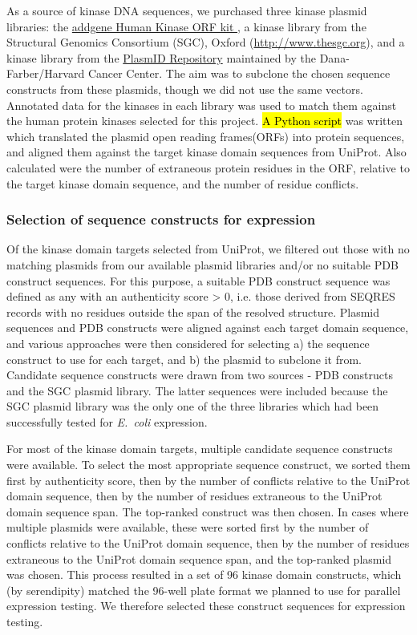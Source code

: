 \documentclass[9pt,lineno]{elife}
\begin{document}
As a source of kinase DNA sequences, we purchased three kinase plasmid libraries: the \href{https://www.addgene.org/human-kinase/}{addgene Human Kinase ORF kit }, a kinase library from the Structural Genomics Consortium (SGC), Oxford (\url{http://www.thesgc.org}), and a kinase library from the \href{https://plasmid.med.harvard.edu/PLASMID/Home.xhtml}{PlasmID Repository} maintained by the Dana-Farber/Harvard Cancer Center.
The aim was to subclone the chosen sequence constructs from these plasmids, though we did not use the same vectors.
Annotated data for the kinases in each library was used to match them against the human protein kinases selected for this project.
\hl{A Python script} was written which translated the plasmid open reading frames(ORFs) into protein sequences, and aligned them against the target kinase domain sequences from UniProt.
Also calculated were the number of extraneous protein residues in the ORF, relative to the target kinase domain sequence, and the number of residue conflicts.


\subsubsection{Selection of sequence constructs for expression}

Of the kinase domain targets selected from UniProt, we filtered out those with no matching plasmids from our available plasmid libraries and/or no suitable PDB construct sequences.
For this purpose, a suitable PDB construct sequence was defined as any with an authenticity score > 0, i.e. those derived from SEQRES records with no residues outside the span of the resolved structure.
Plasmid sequences and PDB constructs were aligned against each target domain sequence, and various approaches were then considered for selecting a) the sequence construct to use for each target, and b) the plasmid to subclone it from.
Candidate sequence constructs were drawn from two sources - PDB constructs and the SGC plasmid library.
The latter sequences were included because the SGC plasmid library was the only one of the three libraries which had been successfully tested for \emph{E.~coli} expression.

For most of the kinase domain targets, multiple candidate sequence constructs were available.
To select the most appropriate sequence construct, we sorted them first by authenticity score, then by the number of conflicts relative to the UniProt domain sequence, then by the number of residues extraneous to the UniProt domain sequence span.
The top-ranked construct was then chosen.
In cases where multiple plasmids were available, these were sorted first by the number of conflicts relative to the UniProt domain sequence, then by the number of residues extraneous to the UniProt domain sequence span, and the top-ranked plasmid was chosen.
This process resulted in a set of 96 kinase domain constructs, which (by serendipity) matched the 96-well plate format we planned to use for parallel expression testing.
We therefore selected these construct sequences for expression testing.
\end{document}
